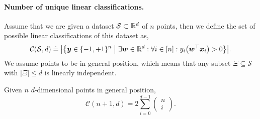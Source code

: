 \paragraph{Number of unique linear classifications.}

Assume that we are given a dataset $\mathcal{S} \subset \mathbb{R}^d$ of $n$ points, then we define the set
of possible linear classifications of this dataset as, \[
    \mathcal{C}(\mathcal{S}, d) \doteq \lft| \lft\{ \vec{y} \in \{ -1, +1 \}^n \;\middle|\; \exists \vec{w} \in \R^d : \forall i \in [n] : y_i \lft( \transpose{\vec{w}} \vec{x}_i \rgt) > 0 \rgt\} \rgt|.
\]
We assume points to be in general position, which means that any subset $\Xi \subseteq \mathcal{S}$
with $|\Xi| \leq d$ is linearly independent.

\begin{theorem}
    Given $n$ $d$-dimensional points in general position, \[
        \mathcal{C}(n+1, d) = 2 \sum_{i=0}^{d-1} \begin{pmatrix} n \\ i \end{pmatrix}.
    \]
\end{theorem}

